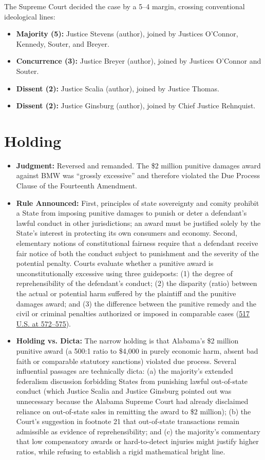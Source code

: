 \documentclass[12pt]{article}
\begin{document}
The Supreme Court decided the case by a 5--4 margin, crossing conventional ideological lines:

\begin{itemize}
\item \textbf{Majority (5):} Justice Stevens (author), joined by Justices O'Connor, Kennedy, Souter, and Breyer.
\item \textbf{Concurrence (3):} Justice Breyer (author), joined by Justices O'Connor and Souter.
\item \textbf{Dissent (2):} Justice Scalia (author), joined by Justice Thomas.
\item \textbf{Dissent (2):} Justice Ginsburg (author), joined by Chief Justice Rehnquist.
\end{itemize}

\section{Holding}

\begin{itemize}
\item \textbf{Judgment:} Reversed and remanded. The \$2 million punitive damages award against BMW was ``grossly excessive'' and therefore violated the Due Process Clause of the Fourteenth Amendment.
\item \textbf{Rule Announced:} First, principles of state sovereignty and comity prohibit a State from imposing punitive damages to punish or deter a defendant's lawful conduct in other jurisdictions; an award must be justified solely by the State's interest in protecting its own consumers and economy. Second, elementary notions of constitutional fairness require that a defendant receive fair notice of both the conduct subject to punishment and the severity of the potential penalty. Courts evaluate whether a punitive award is unconstitutionally excessive using three guideposts: (1) the degree of reprehensibility of the defendant's conduct; (2) the disparity (ratio) between the actual or potential harm suffered by the plaintiff and the punitive damages award; and (3) the difference between the punitive remedy and the civil or criminal penalties authorized or imposed in comparable cases (\href{https://supreme.justia.com/cases/federal/us/517/559/}{517 U.S. at 572--575}).
\item \textbf{Holding vs. Dicta:} The narrow holding is that Alabama's \$2 million punitive award (a 500:1 ratio to \$4,000 in purely economic harm, absent bad faith or comparable statutory sanctions) violated due process. Several influential passages are technically dicta: (a) the majority's extended federalism discussion forbidding States from punishing lawful out-of-state conduct (which Justice Scalia and Justice Ginsburg pointed out was unnecessary because the Alabama Supreme Court had already disclaimed reliance on out-of-state sales in remitting the award to \$2 million); (b) the Court's suggestion in footnote 21 that out-of-state transactions remain admissible as evidence of reprehensibility; and (c) the majority's commentary that low compensatory awards or hard-to-detect injuries might justify higher ratios, while refusing to establish a rigid mathematical bright line.
\end{itemize}
\end{document}
